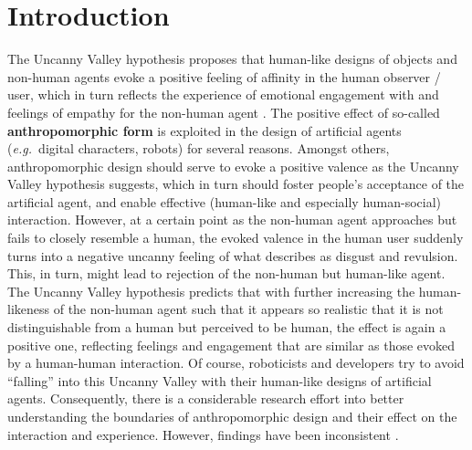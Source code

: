 \documentclass{frontiersSCNS} %
\newcommand{\eg}{{\textit{e.g.~}}}
\begin{document}

\section{Introduction}
\label{sec:intro}

The Uncanny Valley hypothesis \citep{mori_uncanny_1970} proposes that human-like
designs of objects and non-human agents evoke a positive feeling of affinity in
the human observer / user, which in turn reflects the experience of emotional
engagement with and feelings of empathy for the non-human agent
\citep{cheetham_human_2011}. The positive effect of so-called
\textbf{anthropomorphic form} is exploited in the design of artificial agents
(\eg digital characters, robots) for several reasons. Amongst others,
anthropomorphic design should serve to evoke a positive valence as the Uncanny
Valley hypothesis suggests, which in turn should foster people's acceptance of
the artificial agent, and enable effective (human-like and especially
human-social) interaction.  However, at a certain point as the non-human agent
approaches but fails to closely resemble a human, the evoked valence in the
human user suddenly turns into a negative uncanny feeling of what
\cite{mori_uncanny_1970} describes as disgust and revulsion. This, in turn,
might lead to rejection of the non-human but human-like agent.  The Uncanny
Valley hypothesis predicts that with further increasing the human-likeness of
the non-human agent such that it appears so realistic that it is not
distinguishable from a human but perceived to be human, the effect is again a
positive one, reflecting feelings and engagement that are similar as those
evoked by a human-human interaction.  Of course, roboticists and developers try
to avoid ``falling'' into this Uncanny Valley with their human-like designs of
artificial agents. Consequently, there is a considerable research effort into
better understanding the boundaries of anthropomorphic design and their effect
on the interaction and experience. However, findings have been inconsistent
\citep{cheetham_human_2011}.
\end{document}
